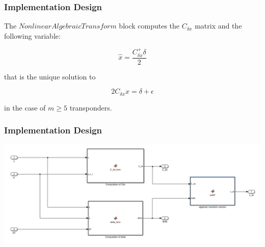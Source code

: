\documentclass{beamer}
\begin{document}
	\begin{frame}
		\frametitle{Implementation Design}
		The $Nonlinear Algebraic Transform$ block computes the $C_{\delta x}$ matrix and the following variable:
		
		\[\hat{x} = \frac {C_{\delta x}^{+} \delta}{2}  \]
		
		that is the unique solution to
		
		\[ 2C_{\delta x} x = \delta + \epsilon \]
		
		in the case of $m \geqslant 5$ transponders.
	\end{frame}
	
	\begin{frame}
		\frametitle{Implementation Design}
		\includegraphics[scale = 0.25]{NLAT}
	\end{frame}
\end{document}
